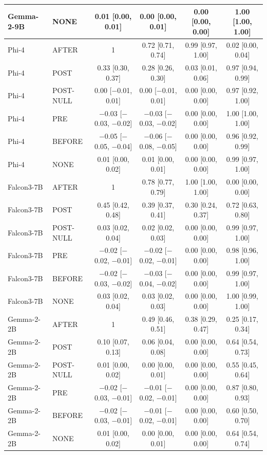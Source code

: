 \begin{tabular}{llcccc}
Gemma-2-9B & NONE & 0.01 [0.00, 0.01] & 0.00 [0.00, 0.01] & 0.00 [0.00, 0.00] & 1.00 [1.00, 1.00] \\
\midrule
Phi-4 & AFTER & 1 & 0.72 [0.71, 0.74] & 0.99 [0.97, 1.00] & 0.02 [0.00, 0.04] \\
Phi-4 & POST & 0.33 [0.30, 0.37] & 0.28 [0.26, 0.30] & 0.03 [0.01, 0.06] & 0.97 [0.94, 0.99] \\
Phi-4 & POST-NULL & 0.00 [$-$0.01, 0.01] & 0.00 [$-$0.01, 0.01] & 0.00 [0.00, 0.00] & 0.97 [0.92, 1.00] \\
Phi-4 & PRE & $-$0.03 [$-$0.03, $-$0.02] & $-$0.03 [$-$0.03, $-$0.02] & 0.00 [0.00, 0.00] & 1.00 [1.00, 1.00] \\
Phi-4 & BEFORE & $-$0.05 [$-$0.05, $-$0.04] & $-$0.06 [$-$0.08, $-$0.05] & 0.00 [0.00, 0.00] & 0.96 [0.92, 0.99] \\
Phi-4 & NONE & 0.01 [0.00, 0.02] & 0.01 [0.00, 0.01] & 0.00 [0.00, 0.00] & 0.99 [0.97, 1.00] \\
\midrule
Falcon3-7B & AFTER & 1 & 0.78 [0.77, 0.79] & 1.00 [1.00, 1.00] & 0.00 [0.00, 0.00] \\
Falcon3-7B & POST & 0.45 [0.42, 0.48] & 0.39 [0.37, 0.41] & 0.30 [0.24, 0.37] & 0.72 [0.63, 0.80] \\
Falcon3-7B & POST-NULL & 0.03 [0.02, 0.04] & 0.02 [0.02, 0.03] & 0.00 [0.00, 0.00] & 0.99 [0.97, 1.00] \\
Falcon3-7B & PRE & $-$0.02 [$-$0.02, $-$0.01] & $-$0.02 [$-$0.02, $-$0.01] & 0.00 [0.00, 0.00] & 0.98 [0.96, 1.00] \\
Falcon3-7B & BEFORE & $-$0.02 [$-$0.03, $-$0.02] & $-$0.03 [$-$0.04, $-$0.02] & 0.00 [0.00, 0.00] & 0.99 [0.97, 1.00] \\
Falcon3-7B & NONE & 0.03 [0.02, 0.04] & 0.03 [0.02, 0.03] & 0.00 [0.00, 0.00] & 1.00 [0.99, 1.00] \\
\midrule
Gemma-2-2B & AFTER & 1 & 0.49 [0.46, 0.51] & 0.38 [0.29, 0.47] & 0.25 [0.17, 0.34] \\
Gemma-2-2B & POST & 0.10 [0.07, 0.13] & 0.06 [0.04, 0.08] & 0.00 [0.00, 0.00] & 0.64 [0.54, 0.73] \\
Gemma-2-2B & POST-NULL & 0.01 [0.00, 0.02] & 0.00 [0.00, 0.01] & 0.00 [0.00, 0.00] & 0.55 [0.45, 0.64] \\
Gemma-2-2B & PRE & $-$0.02 [$-$0.03, $-$0.01] & $-$0.01 [$-$0.02, $-$0.01] & 0.00 [0.00, 0.00] & 0.87 [0.80, 0.93] \\
Gemma-2-2B & BEFORE & $-$0.02 [$-$0.03, $-$0.01] & $-$0.01 [$-$0.02, $-$0.01] & 0.00 [0.00, 0.00] & 0.60 [0.50, 0.70] \\
Gemma-2-2B & NONE & 0.01 [0.00, 0.02] & 0.00 [0.00, 0.01] & 0.00 [0.00, 0.00] & 0.64 [0.54, 0.74] \\
\bottomrule
\end{tabular}
